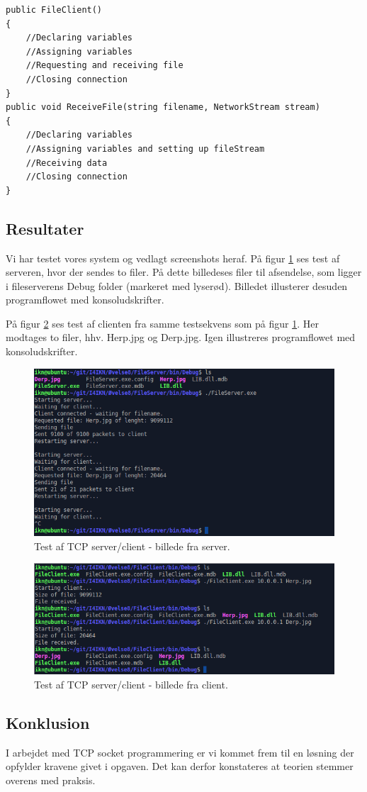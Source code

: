 \begin{lstlisting}[caption = Hoveddesign for client,label=code:tcpClient]
public FileClient()
{
	//Declaring variables
	//Assigning variables
	//Requesting and receiving file
	//Closing connection
}
public void ReceiveFile(string filename, NetworkStream stream)
{
	//Declaring variables
	//Assigning variables and setting up fileStream
	//Receiving data
	//Closing connection
}
\end{lstlisting}

\subsection{Resultater}
Vi har testet vores system og vedlagt screenshots heraf. På figur \ref{fig:tcp_h1} ses test af serveren, hvor der sendes to filer. På dette billedeses filer til afsendelse, som ligger i fileserverens Debug folder (markeret med lyserød). Billedet illusterer desuden programflowet med konsoludskrifter.

På figur \ref{fig:tcp_h2} ses test af clienten fra samme testsekvens som på figur \ref{fig:tcp_h1}. Her modtages to filer, hhv. Herp.jpg og Derp.jpg. Igen illustreres programflowet med konsoludskrifter. 

\begin{figure}[H]
	\centering
	\includegraphics[width=0.9\linewidth]{figs/tcp_h1}
	\caption{Test af TCP server/client - billede fra server.}
	\label{fig:tcp_h1}
\end{figure}

\begin{figure}[H]
	\centering
	\includegraphics[width=0.9\linewidth]{figs/tcp_h2}
	\caption{Test af TCP server/client - billede fra client.}
	\label{fig:tcp_h2}
\end{figure}

\subsection{Konklusion}
I arbejdet med TCP socket programmering er vi kommet frem til en løsning der opfylder kravene givet i opgaven. Det kan derfor konstateres at teorien stemmer overens med praksis.